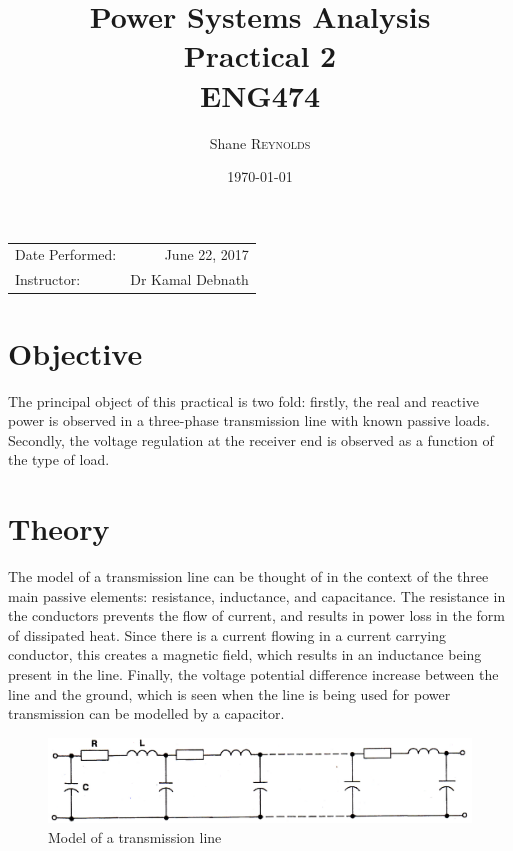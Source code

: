 \documentclass{article}
\title{Power Systems Analysis \\ Practical 2 \\ ENG474} %
\author{Shane \textsc{Reynolds}} %
\date{\today} %
\begin{document}
\maketitle %

\begin{center}
\begin{tabular}{l r}
Date Performed: & June 22, 2017 \\ %
Instructor: & Dr Kamal Debnath %
\end{tabular}
\end{center}


\section{Objective}
The principal object of this practical is two fold: firstly, the real and reactive power is observed in a three-phase transmission line with known passive loads. Secondly, the voltage regulation at the receiver end is observed as a function of the type of load.


\section{Theory}
The model of a transmission line can be thought of in the context of the three main passive elements: resistance, inductance, and capacitance. The resistance in the conductors prevents the flow of current, and results in power loss in the form of dissipated heat. Since there is a current flowing in a current carrying conductor, this creates a magnetic field, which results in an inductance being present in the line. Finally, the voltage potential difference increase between the line and the ground, which is seen when the line is being used for power transmission can be modelled by a capacitor.
\begin{figure}[H]
	\centering
	\includegraphics[scale=0.7]{fig1}
	\caption{Model of a transmission line}
\end{figure}
\end{document}
